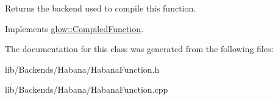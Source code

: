 \begin{DoxyReturn}{Returns}
the backend used to compile this function. 
\end{DoxyReturn}


Implements \hyperlink{classglow_1_1_compiled_function_a7b3f2b17986d14706a1d1091d3c4df27}{glow\+::\+Compiled\+Function}.



The documentation for this class was generated from the following files\+:\begin{DoxyCompactItemize}
\item 
lib/\+Backends/\+Habana/Habana\+Function.\+h\item 
lib/\+Backends/\+Habana/Habana\+Function.\+cpp\end{DoxyCompactItemize}
